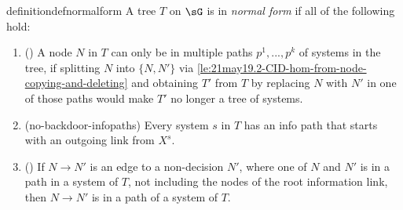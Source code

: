 


\begin{restatable}{definition}{defnormalform} %
\label{def:sep5.3-normal-form-graph-with-tree}
A tree $T$ on $\sG$ is 
in
\emph{normal form} if all of the following hold:
\begin{enumerate}[label=(\alph*)]

    \item \label{def:sep5.3c-unique-systems-and-paths}
    (\systemsAndPathsUniquenessForDef) 
    A node $N$ in $T$ can only be in multiple paths $p^1,..., p^k$ of systems in the tree, if splitting $N$ into $\{N,N'\}$ via \cref{le:21may19.2-CID-hom-from-node-copying-and-deleting} and obtaining $T'$ from $T$ by replacing $N$ with $N'$ in one of those paths would make $T'$ no longer a tree of systems.

    \item (no-backdoor-infopaths) \label{def:sep5.3b-appropriate-tree}
    Every system $s$ in $T$ has an info path that starts with an outgoing link from $X^s$. 

    \item (\noRedundantLinks) \label{def:sep5.3e-no-redundant-links}
    If $N \to N'$ is an edge to a non-decision $N'$, where 
    one of $N$ and $N'$ is in a path in a system of $T$, 
    not including the nodes of the root information link, 
    then $N \to N'$ is in a path of a system of $T$.~
    
           
        
    
    
  

\end{enumerate}
\end{restatable}





